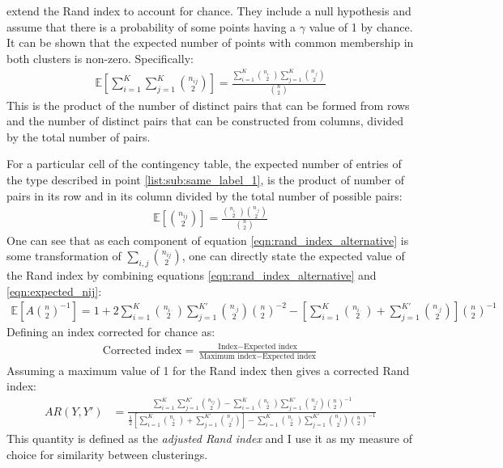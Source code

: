 \documentclass[14pt]{extarticle} %
\begin{document}
	\citet{HubertComparingpartitions1985} extend the Rand index to account for chance. They include a null hypothesis and assume that there is a probability of some points having a $\gamma$ value of 1 by chance. It can be shown that the expected number of points with common membership in both clusters is non-zero. Specifically:
	\begin{eqnarray}
	\mathbb{E}\left[\sum_{i=1}^K \sum_{j=1}^K\binom{n_{ij}}{2}\right] = \frac{\sum_{i=1}^K \binom{n_{i\cdot}}{2} \sum_{j=1}^K \binom{n_{\cdot j}}{2}}{\binom{n}{2}}
	\end{eqnarray}
	This is the product of the number of distinct pairs that can be formed from rows and the number of distinct pairs that can be constructed from columns, divided by the total number of pairs. 
	
	For a particular cell of the contingency table, the expected number of entries of the type described in point \ref{list:sub:same_label_1}, is the product of number of pairs in its row and in its column divided by the total number of possible pairs:
	\begin{eqnarray} \label{eqn:expected_nij}
	\mathbb{E}\left[\binom{n_{ij}}{2}\right] = \frac{\binom{n_{i\cdot}}{2}\binom{n_{\cdot j}}{2}}{\binom{n}{2}}
	\end{eqnarray}
	One can see that as each component of equation \ref{eqn:rand_index_alternative} is some transformation of $\sum_{i,j}\binom{n_{ij}}{2}$, one can directly state the expected value of the Rand index by combining equations \ref{eqn:rand_index_alternative} and \ref{eqn:expected_nij}:
	\begin{eqnarray}
	\mathbb{E}\left[A \binom{n}{2}^{-1}\right] = 1 + 2 \sum_{i=1}^{K} \binom{n_{i \cdot}}{2} \sum_{j=1}^{K'} \binom{n_{\cdot j}}{2} \binom{n}{2}^{-2} - \left[\sum_{i=1}^{K} \binom{n_{i \cdot}}{2} + \sum_{j=1}^{K'} \binom{n_{\cdot j}}{2}\right] \binom{n}{2}^{-1}
	\end{eqnarray}
	Defining an index corrected for chance as:
	\begin{eqnarray}
	\text{Corrected index} = \frac{\text{Index} - \text{Expected index}}{\text{Maximum index} - \text{Expected index}}
	\end{eqnarray}
	Assuming a maximum value of 1 for the Rand index then gives a corrected Rand index:
	\begin{eqnarray} \label{eqn:adjusted_rand_index}
	AR(Y, Y') &= \frac{\sum_{i=1}^{K}\sum_{j=1}^{K'} \binom{n_{ij}}{2} - \sum_{i=1}^{K} \binom{n_{i \cdot}}{2} \sum_{j=1}^{K'} \binom{n_{\cdot j}}{2} \binom{n}{2}^{-1}}{\frac{1}{2} \left[\sum_{i=1}^{K} \binom{n_{i \cdot}}{2} + \sum_{j=1}^{K'} \binom{n_{\cdot j}}{2}\right] - \sum_{i=1}^{K} \binom{n_{i \cdot}}{2} \sum_{j=1}^{K'} \binom{n_{\cdot j}}{2} \binom{n}{2}^{-1}}
	\end{eqnarray}
	This quantity is defined as the \emph{adjusted Rand index} and I use it as my measure of choice for similarity between clusterings.
	
\end{document}
